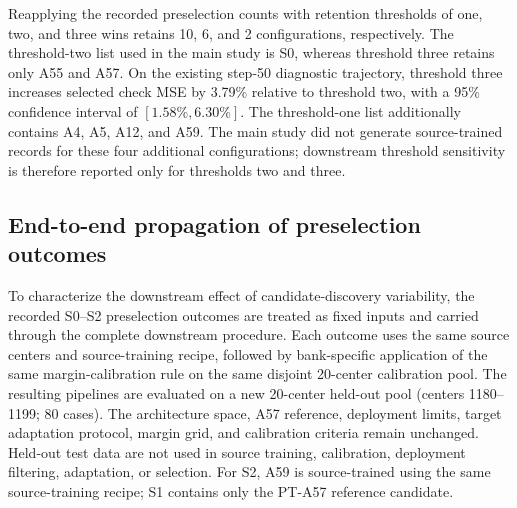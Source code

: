 \documentclass[11pt,a4paper]{article}
\begin{document}
Reapplying the recorded preselection counts with retention thresholds of one,
two, and three wins retains 10, 6, and 2 configurations, respectively. The threshold-two list used in the main study is S0, whereas threshold three retains only A55 and
A57. On the existing step-50 diagnostic trajectory, threshold three increases
selected check MSE by 3.79\% relative to threshold two, with a 95\% confidence
interval of $[1.58\%,6.30\%]$. The threshold-one list additionally contains A4, A5, A12, and A59. The main study did not generate source-trained records for these four
additional configurations; downstream threshold sensitivity is therefore
reported only for thresholds two and three.

\subsection{End-to-end propagation of preselection outcomes}

To characterize the downstream effect of candidate-discovery variability,
the recorded S0--S2 preselection outcomes are treated as fixed inputs and carried
through the complete downstream procedure. Each outcome uses the same source
centers and source-training recipe, followed by bank-specific application of the same margin-calibration rule on the same disjoint 20-center
calibration pool. The resulting pipelines are evaluated on a new 20-center
held-out pool (centers 1180--1199; 80 cases). The architecture space, A57
reference, deployment limits, target adaptation protocol, margin grid, and
calibration criteria remain unchanged. Held-out test data are not used in
source training, calibration, deployment filtering, adaptation, or selection.
For S2, A59 is source-trained using the same source-training recipe; S1
contains only the PT-A57 reference candidate.
\end{document}
